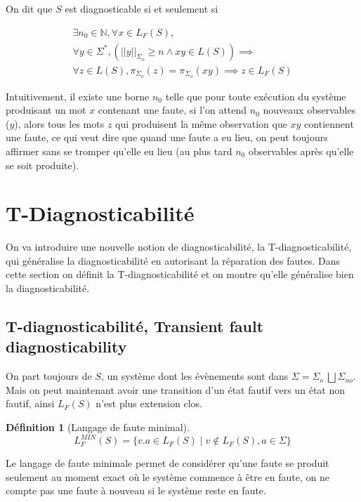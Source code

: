 \documentclass[conference]{IEEEtran}
\newtheorem{mydef}{D\'efinition}
\begin{document}
On dit que $S$ est diagnosticable si et seulement si

$$\begin{array}{l}
\exists n_0 \in \mathbb N, \forall x \in L_F(S),\\
\forall y \in \Sigma^*, \left(||y||_{\Sigma_o} \ge n \land xy \in  L(S)\right) \implies\\
\forall z \in L(S), \pi_{\Sigma_o}(z)=\pi_{\Sigma_o}(xy) \implies z \in L_F(S)
\end{array}$$

Intuitivement, il existe une borne $n_0$ telle que pour toute ex\'ecution du système produisant un mot $x$ contenant une faute, si l'on attend $n_0$ nouveaux observables ($y$), alors tous les mots $z$ qui produisent la m\^eme observation que $xy$ contiennent une faute, ce qui veut dire que quand une faute a eu lieu, on peut toujours affirmer sans se tromper qu'elle eu lieu (au plus tard $n_0$ observables après qu'elle se soit produite).



\section{T-Diagnosticabilité}

On va introduire une nouvelle notion de diagnosticabilité, la T-diagnosticabilité,  qui généralise la diagnosticabilité en autorisant la réparation des fautes. Dans cette section on définit la T-diagnosticabilité et on montre qu'elle généralise bien la diagnosticabilité.

\subsection{T-diagnosticabilité, Transient fault diagnosticability}
On part toujours de $S$, un système dont les évènements sont dans $\Sigma = \Sigma_o \ \bigsqcup \Sigma_{no}$. Mais on peut maintenant avoir une transition d'un état fautif vers un état non fautif, ainsi $L_F(S)$ n'est plus extension clos.

\begin{mydef}[Langage de faute minimal]

$$L_{F}^{MIN}(S) =  \{v.a \in L_F(S) \mid v\not \in L_F(S), a\in \Sigma \} $$
\end{mydef}

Le langage de faute minimale permet de considérer qu'une faute se produit seulement au moment exact où le système commence à être en faute, on ne compte pas une faute à nouveau si le système reste en faute.
\end{document}
